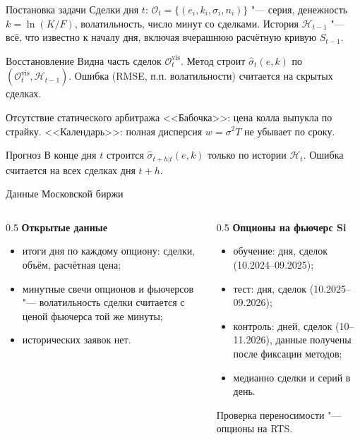 \documentclass[aspectratio=169]{beamer}
\begin{document}
\begin{frame}{Постановка задачи}
    Сделки дня $t$: $\mathcal{O}_t = \{(e_i, k_i, \sigma_i, n_i)\}$ "--- серия, денежность $k = \ln(K/F)$, волатильность, число минут со сделками. История $\mathcal{H}_{t-1}$ "--- всё, что известно к началу дня, включая вчерашнюю расчётную кривую $S_{t-1}$.
    \begin{block}{Восстановление}
        Видна часть сделок $\mathcal{O}^{\mathrm{vis}}_t$. Метод строит $\hat\sigma_t(e, k)$ по $(\mathcal{O}^{\mathrm{vis}}_t, \mathcal{H}_{t-1})$. Ошибка (RMSE, п.п. волатильности) считается на скрытых сделках.
    \end{block}
    \begin{block}{Отсутствие статического арбитража}
        <<Бабочка>>: цена колла выпукла по страйку. <<Календарь>>: полная дисперсия $w = \sigma^2 T$ не убывает по сроку.
    \end{block}
    \begin{block}{Прогноз}
        В конце дня $t$ строится $\hat\sigma_{t+h|t}(e,k)$ только по истории $\mathcal{H}_t$. Ошибка считается на всех сделках дня $t+h$.
    \end{block}
\end{frame}

\begin{frame}{Данные Московской биржи}
    \begin{columns}
    \begin{column}{0.5\textwidth}
        \textbf{Открытые данные}
        \begin{itemize}
            \item итоги дня по каждому опциону: сделки, объём, расчётная цена;
            \item минутные свечи опционов и фьючерсов "--- волатильность сделки считается с ценой фьючерса той же минуты;
            \item исторических заявок нет.
        \end{itemize}
    \end{column}
    \begin{column}{0.5\textwidth}
        \textbf{Опционы на фьючерс Si}
        \begin{itemize}
            \item обучение:  дня,  сделок (10.2024--09.2025);
            \item тест:  дня,  сделок (10.2025--09.2026);
            \item контроль:  дней,  сделок (10--11.2026), данные получены после фиксации методов;
            \item медианно  сделки и  серий в день.
        \end{itemize}
        \medskip
        Проверка переносимости "--- опционы на RTS.
    \end{column}
    \end{columns}
\end{frame}
\end{document}
